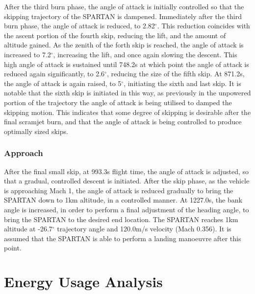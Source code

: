 After the third burn phase, the angle of attack is initially controlled so that the skipping trajectory of the SPARTAN is dampened.
Immediately after the third burn phase, the angle of attack is reduced, to 2.82$^\circ$. This reduction coincides with the ascent portion of the fourth skip, reducing the lift, and the amount of altitude gained. 
As the zenith of the forth skip is reached, the angle of attack is increased to 7.2$^\circ$, increasing the lift, and once again slowing the descent. 
This high angle of attack is sustained until 748.2s at which point the angle of attack is reduced again significantly, to 2.6$^\circ$, reducing the size of the fifth skip. At 871.2s, the angle of attack is again raised, to 5$^\circ$, initiating the sixth and last skip.
It is notable that the sixth skip is initiated in this way, as previously in the unpowered portion of the trajectory the angle of attack is being utilised to damped the skipping motion. This indicates that some degree of skipping is desirable after the final scramjet burn, and that the angle of attack is being controlled to produce optimally sized skips. 

\subsubsection{ Approach}

After the final small skip, at 993.3s flight time, the angle of attack is adjusted, so that a gradual, controlled descent is initiated. 
After the skip phase, as the vehicle is approaching Mach 1, the angle of attack is reduced gradually to bring the SPARTAN down to 1km altitude, in a controlled manner. At 1227.0s, the bank angle is increased, in order to perform a final adjustment of the heading angle, to bring the SPARTAN to the desired end location. 
The SPARTAN reaches 1km altitude at -26.7$^\circ$ trajectory angle and 120.0m/s velocity (Mach 0.356). It is assumed that the SPARTAN is able to perform a landing manoeuvre after this point. 





\section{Energy Usage Analysis}


